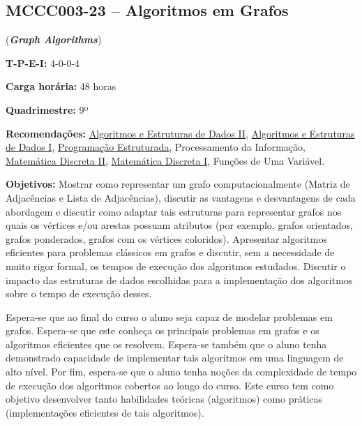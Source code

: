 \documentclass[class=article, crop=false]{standalone}
\begin{document}
\subsection*{MCCC003-23 -- Algoritmos em Grafos}
\label{disc:ag}

(\textbf{\textit{Graph Algorithms}})

\begin{center}
    \begin{minipage}{0.85\textwidth}
        \textbf{T-P-E-I:} 4-0-0-4
        
        \textbf{Carga horária:} 48 horas
        
        \textbf{Quadrimestre:} 9º
        
        \textbf{Recomendações:} 
        \hyperref[disc:aedII]{Algoritmos e Estruturas de Dados II},
        \hyperref[disc:aedI]{Algoritmos e Estruturas de Dados I},
        \hyperref[disc:pe]{Programação Estruturada},
        Processamento da Informação,
        \hyperref[disc:mdII]{Matemática Discreta II},
        \hyperref[disc:mdI]{Matemática Discreta I},
        Funções de Uma Variável.
    \end{minipage}
\end{center}

\textbf{Objetivos:}
Mostrar como representar um grafo computacionalmente (Matriz de Adjacências e
Lista de Adjacências), discutir as vantagens e desvantagens de cada abordagem e
discutir como adaptar tais estruturas para representar grafos nos quais os
vértices e/ou arestas possuam atributos (por exemplo, grafos orientados, grafos
ponderados, grafos com os vértices coloridos).
Apresentar algoritmos eficientes para problemas clássicos em grafos e discutir,
sem a necessidade de muito rigor formal, os tempos de execução dos algoritmos
estudados. 
Discutir o impacto das estruturas de dados escolhidas para a implementação dos
algoritmos sobre o tempo de execução desses.

Espera-se que ao final do curso o aluno seja capaz de modelar problemas em
grafos. Espera-se que este conheça os principais problemas em grafos e os
algoritmos eficientes que os resolvem. Espera-se também que o aluno tenha
demonstrado capacidade de implementar tais algoritmos em uma linguagem de alto
nível. Por fim, espera-se que o aluno tenha noções da complexidade de tempo de
execução dos algoritmos cobertos ao longo do curso. Este curso tem como
objetivo desenvolver tanto habilidades teóricas (algoritmos) como práticas
(implementações eficientes de tais algoritmos).
\end{document}
